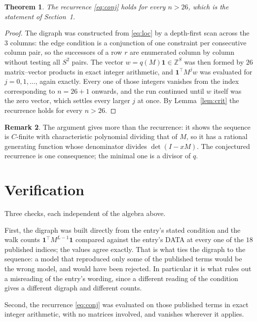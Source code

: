 \documentclass[11pt,a4paper]{article}
\theoremstyle{plain}
\newtheorem{theorem}{Theorem}
\theoremstyle{definition}
\newtheorem{remark}[theorem]{Remark}
\begin{document}
\begin{theorem}
The recurrence \eqref{eq:conj} holds for every $n>26$, which is the statement of
Section~1.
\end{theorem}

\begin{proof}
The digraph was constructed from \eqref{eq:loc} by a depth-first scan across the $3$
columns: the edge condition is a conjunction of one constraint per consecutive column
pair, so the successors of a row $r$ are enumerated column by column without testing all
$S^2$ pairs. The vector $w=q(M)\mathbf{1}\in\mathbb{Z}^{S}$ was then formed by $26$
matrix--vector products in exact integer arithmetic, and $\mathbf{1}^{\!\top}M^{j}w$ was
evaluated for $j=0,1,\dots$, again exactly. Every one of those integers vanishes from the
index corresponding to $n=26+1$ onwards, and the run continued until $w$ itself was the
zero vector, which settles every larger $j$ at once. By Lemma~\ref{lem:crit} the recurrence
holds for every $n>26$.
\end{proof}

\begin{remark}
The argument gives more than the recurrence: it shows the sequence is $C$-finite with
characteristic polynomial dividing that of $M$, so it has a rational generating function
whose denominator divides $\det(I-xM)$. The conjectured recurrence is one consequence; the
minimal one is a divisor of $q$.
\end{remark}

\section{Verification}

Three checks, each independent of the algebra above.

First, the digraph was built directly from the entry's stated condition and the walk counts
$\mathbf{1}^{\!\top}M^{L-1}\mathbf{1}$ compared against the entry's DATA at
every one of the $18$ published indices; the values agree exactly. That is what ties
the digraph to the sequence: a model that reproduced only some of the published terms would
be the wrong model, and would have been rejected. In particular it is what rules out a
misreading of the entry's wording, since a different reading of the condition gives a
different digraph and different counts.

Second, the recurrence \eqref{eq:conj} was evaluated on those published terms in exact
integer arithmetic, with no matrices involved, and vanishes wherever it applies.
\end{document}
